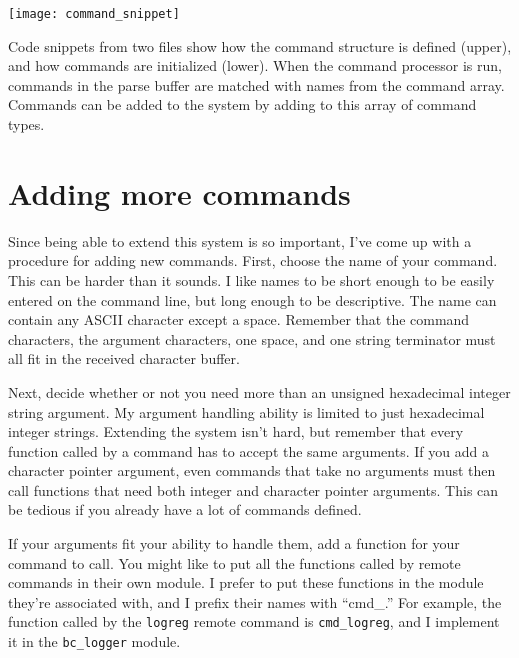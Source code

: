 \begin{listing}[ht]
    \begin{center}
        \texttt{[image: command\_snippet]}
        \caption{Code snippets from two files show how the command structure is defined (upper), and how commands are initialized (lower).  When the command processor is run, commands in the parse buffer are matched with names from the command array.  Commands can be added to the system by adding to this array of command types.\label{lst:cmdsnip}}
    \end{center}
\end{listing}

\clearpage{}
\section{Adding more commands}
Since being able to extend this system is so important, I've come up with a procedure for adding new commands.  First, choose the name of your command.  This can be harder than it sounds.  I like names to be short enough to be easily entered on the command line, but long enough to be descriptive.  The name can contain any ASCII character except a space.  Remember that the command characters, the argument characters, one space, and one string terminator must all fit in the received character buffer.
    
Next, decide whether or not you need more than an unsigned hexadecimal integer string argument.  My argument handling ability is limited to just hexadecimal integer strings.  Extending the system isn't hard, but remember that every function called by a command has to accept the same arguments.  If you add a character pointer argument, even commands that take no arguments must then call functions that need both integer and character pointer arguments.  This can be tedious if you already have a lot of commands defined.

If your arguments fit your ability to handle them, add a function for your command to call.  You might like to put all the functions called by remote commands in their own module.  I prefer to put these functions in the module they're associated with, and I prefix their names with ``cmd\_.'' For example, the function called by the \texttt{logreg} remote command is \texttt{cmd\_logreg}, and I implement it in the \texttt{bc\_logger} module.

